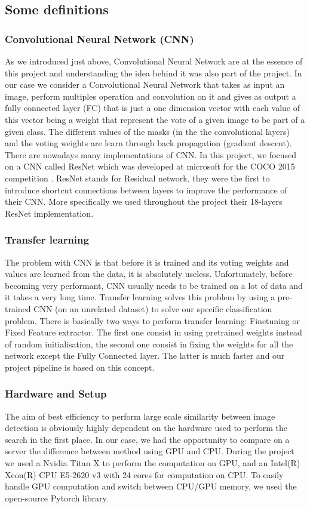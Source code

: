 \documentclass[a4paper]{article}
\begin{document}
	\subsection*{Some definitions}
		\subsubsection*{Convolutional Neural Network (CNN)}
		
		As we introduced just above, Convolutional Neural Network are at the essence of this project and understanding the idea behind it was also part of the project. In our case we consider a Convolutional Neural Network that takes as input an image, perform multiples operation and convolution on it and gives as output a fully connected layer (FC) that is just a one dimension vector with each value of this vector being a weight that represent the vote of a given image to be part of a given class. The different values of the masks (in the the convolutional layers) and the voting weights are learn through back propagation (gradient descent). There are nowadays many implementations of CNN. In this project, we focused on a CNN called ResNet which was developed at microsoft for the COCO 2015 competition \cite{resnet}. ResNet stands for Residual network, they were the first to introduce shortcut connections between layers to improve the performance of their CNN. More specifically we used throughout the project their 18-layers ResNet implementation.
		
		\subsubsection*{Transfer learning}
		
		The problem with CNN is that before it is trained and its voting weights and values are learned from the data, it is absolutely useless. Unfortunately, before becoming very performant, CNN usually needs to be trained on a lot of data and it takes a very long time. Transfer learning solves this problem by using a pre-trained CNN (on an unrelated dataset) to solve our specific classification problem. There is basically two ways to perform transfer learning: Finetuning or Fixed Feature extractor. The first one consist in using pretrained weights instead of random initialisation, the second one consist in fixing the weights for all the network except the Fully Connected layer. The latter is much faster and our project pipeline is based on this concept.

		\subsubsection*{Hardware and Setup}
		The aim of best efficiency to perform large scale similarity between image detection is obviously highly dependent on the hardware used to perform the search in the first place. In our case, we had the opportunity to compare on a server the difference between method using GPU and CPU. During the project we used a Nvidia Titan X to perform the computation on GPU, and an Intel(R) Xeon(R) CPU E5-2620 v3 with 24 cores for computation on CPU. To easily handle GPU computation and switch between CPU/GPU memory, we used the open-source Pytorch library.
		
\end{document}
